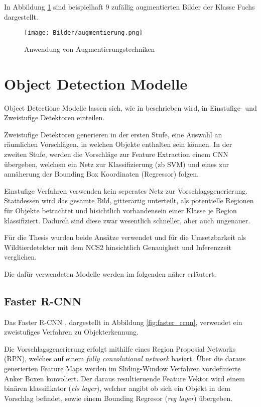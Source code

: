 In Abbildung \ref{fig:augmentierung} sind beispielhaft 9 
zufällig augmentierten Bilder der Klasse Fuchs dargestellt.


\begin{figure}[H]
    \centering
    \texttt{[image: Bilder/augmentierung.png]}
    \caption{Anwendung von Augmentierungstechniken}
    \label{fig:augmentierung}
\end{figure}


\section{Object Detection Modelle}


Object Detectione Modelle lassen sich, wie in 
\cite{wuRecentAdvancesDeep2019} beschrieben wird,
in Einstufige- und Zweistufige Detektoren einteilen.

Zweistufige Detektoren generieren in der 
ersten Stufe, 
eine Auswahl an räumlichen Vorschlägen, in welchen 
Objekte enthalten sein können. In der zweiten Stufe, 
werden die Vorschläge zur Feature Extraction 
einem CNN übergeben, welchem ein Netz zur Klassifizierung 
(zb SVM) und eines zur annäherung der Bounding Box 
Koordinaten (Regressor) folgen.

Einstufige Verfahren verwenden kein seperates 
Netz zur Vorschlagsgenerierung. Stattdessen 
wird das gesamte Bild, gitterartig unterteilt,
als potentielle Regionen für Objekte betrachtet 
und hisichtlich vorhandensein einer Klasse je 
Region klassifiziert.
Dadurch sind diese zwar wesentlich schneller, 
aber auch ungenauer.


Für die Thesis wurden beide Ansätze verwendet und 
für die Umsetzbarkeit als Wildtierdetektor 
mit dem NCS2 hinsichtlich Genauigkeit und 
Inferenzzeit verglichen.

Die dafür verwendeten Modelle werden im folgenden 
näher erläutert.



\subsection*{Faster R-CNN}

Das Faster R-CNN \cite{renFasterRCNNRealTime2016a}, 
dargestellt in Abbildung \ref{fig:faster_rcnn}, 
verwendet ein zweistufiges Verfahren zu 
Objekterkennung.

Die Vorschlagsgenerierung erfolgt mithilfe eines 
Region Proposial Networks (RPN), welches auf 
einem \textit{fully convolutional network} 
basiert.
Über die daraus generierten Feature Maps werden im 
Sliding-Window Verfahren vordefinierte Anker Boxen 
konvoliert.
Der daraus resultieruende Feature Vektor wird 
einem binären klassifikator (\textit{cls layer}), 
welcher angibt ob sich ein Objekt in dem Vorschlag befindet, 
sowie einem Bounding Regresor (\textit{reg layer}) übergeben.


